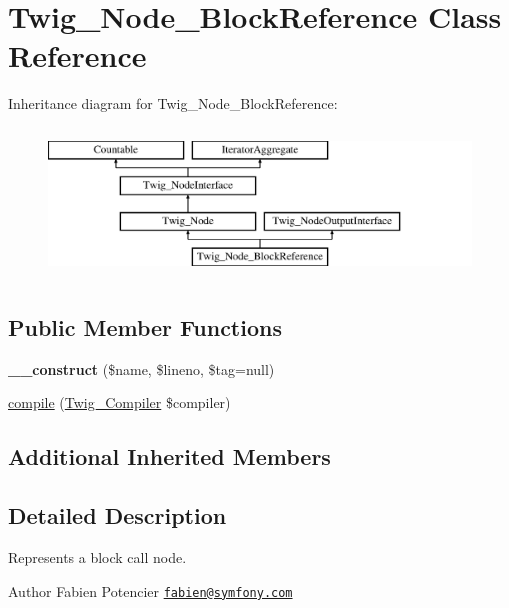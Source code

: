 \hypertarget{classTwig__Node__BlockReference}{}\section{Twig\+\_\+\+Node\+\_\+\+Block\+Reference Class Reference}
\label{classTwig__Node__BlockReference}
Inheritance diagram for Twig\+\_\+\+Node\+\_\+\+Block\+Reference\+:\begin{figure}[H]
\begin{center}
\leavevmode
\includegraphics[height=4.000000cm]{classTwig__Node__BlockReference}
\end{center}
\end{figure}
\subsection*{Public Member Functions}
\begin{DoxyCompactItemize}
\item 
{\bfseries \+\_\+\+\_\+construct} (\$name, \$lineno, \$tag=null)\hypertarget{classTwig__Node__BlockReference_a0665fe95a09f4b4eb7e7d0cd8c4fef24}{}\label{classTwig__Node__BlockReference_a0665fe95a09f4b4eb7e7d0cd8c4fef24}

\item 
\hyperlink{classTwig__Node__BlockReference_ae403d69579c887f5f40d801eade2ba73}{compile} (\hyperlink{classTwig__Compiler}{Twig\+\_\+\+Compiler} \$compiler)
\end{DoxyCompactItemize}
\subsection*{Additional Inherited Members}


\subsection{Detailed Description}
Represents a block call node.

\begin{DoxyAuthor}{Author}
Fabien Potencier \href{mailto:fabien@symfony.com}{\tt fabien@symfony.\+com} 
\end{DoxyAuthor}


